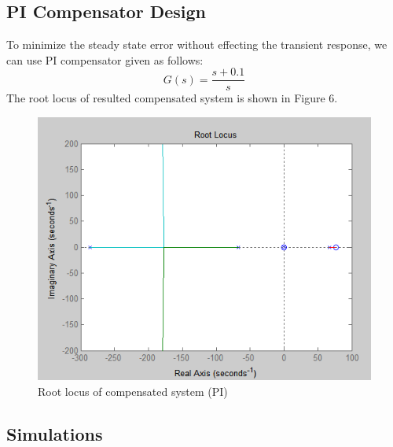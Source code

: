 \documentclass{article}
\begin{document}
\subsection{PI Compensator Design}
To minimize the steady state error without effecting the transient response, we can use PI compensator given as follows:
\[ G(s) = \frac{s+0.1}{s} \]
The root locus of resulted compensated system is shown in Figure 6.
\begin{figure}[h]
  \includegraphics[width=\linewidth]{fig3.PNG}
  \caption{Root locus of compensated system (PI)}
  \label{fig:boat1}
\end{figure}

\subsection{Simulations}
\end{document}
